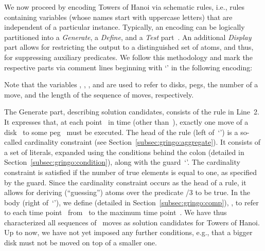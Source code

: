 We now proceed by encoding Towers of Hanoi via schematic rules,
i.e., rules containing variables (whose names start with uppercase letters)
that are independent of a particular instance.
Typically, an encoding can be logically partitioned
into a \emph{Generate}, a \emph{Define}, and a \emph{Test} part~\cite{lifschitz02a}.
An additional \emph{Display} part allows for restricting
the output to a distinguished set of atoms,
and thus, for suppressing auxiliary predicates.
%
We follow this methodology and
mark the respective parts via comment lines beginning with `\code{\%}' 
in the following encoding:%
%
%

%
Note that the variables , , , and  are used
to refer to disks, pegs, 
the number of a move, and the length of the sequence of moves, respectively.

The Generate part, describing solution candidates, consists of the rule in Line~2.
It expresses that,
at each point~ in time (other than~),
exactly one move of a disk~ to some peg~
must be executed.
The head of the rule (left of~`\code{:-}')
is a so-called cardinality constraint (see Section~\ref{subsec:gringo:aggregate}).
It consists of a set of literals,
expanded using the conditions behind the colon (detailed in Section~\ref{subsec:gringo:condition}),
along with the guard~`'.
The cardinality constraint is satisfied
if the number of true elements is equal to one, as specified by the guard.
Since the cardinality constraint occurs as the head of a rule,
it allows for deriving (``guessing'') atoms 
over the predicate /$3$ to be true.
In the body (right of~`\code{:-}'),
we define (detailed in Section~\ref{subsec:gringo:comp}),
,
to refer to each time point~
from~ to the maximum time point~.
We have thus characterized all sequences of~ moves
as solution candidates for Towers of Hanoi.
Up to now, 
we have not yet imposed any further conditions, e.g.,
that a bigger disk must not be moved on top of a smaller one.

